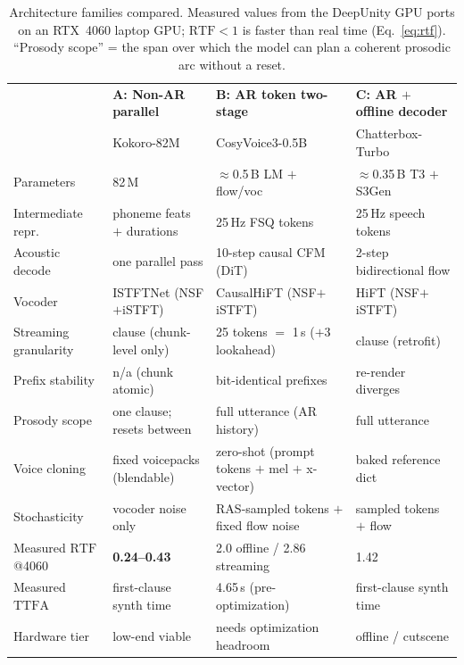 \documentclass[11pt,a4paper]{article}
\newcommand{\RTF}{\ensuremath{\mathrm{RTF}}}
\newcommand{\TTFA}{\ensuremath{\mathrm{TTFA}}}
\begin{document}
\begin{table}[htbp]
\centering
\caption{Architecture families compared. Measured values from the DeepUnity GPU ports on
an RTX~4060 laptop GPU; $\RTF < 1$ is faster than real time
(Eq.~\ref{eq:rtf}). ``Prosody scope'' = the span over which the model can plan a coherent
prosodic arc without a reset.}
\label{tab:families}
\small
\begin{tabular}{@{}p{3.4cm}p{3.6cm}p{3.8cm}p{3.6cm}@{}}
\toprule
 & \textbf{A: Non-AR parallel} & \textbf{B: AR token two-stage} & \textbf{C: AR $+$ offline decoder} \\
 & Kokoro-82M & CosyVoice3-0.5B & Chatterbox-Turbo \\
\midrule
Parameters & 82\,M & $\approx$0.5\,B LM $+$ flow/voc & $\approx$0.35\,B T3 $+$ S3Gen \\
Intermediate repr. & phoneme feats $+$ durations & 25\,Hz FSQ tokens & 25\,Hz speech tokens \\
Acoustic decode & one parallel pass & 10-step causal CFM (DiT) & 2-step bidirectional flow \\
Vocoder & ISTFTNet (NSF$+$iSTFT) & CausalHiFT (NSF$+$iSTFT) & HiFT (NSF$+$iSTFT) \\
Streaming granularity & clause (chunk-level only) & 25 tokens $=$ 1\,s ($+$3 lookahead) & clause (retrofit) \\
Prefix stability & n/a (chunk atomic) & bit-identical prefixes & re-render diverges \\
Prosody scope & one clause; resets between & full utterance (AR history) & full utterance \\
Voice cloning & fixed voicepacks (blendable) & zero-shot (prompt tokens $+$ mel $+$ x-vector) & baked reference dict \\
Stochasticity & vocoder noise only & RAS-sampled tokens $+$ fixed flow noise & sampled tokens $+$ flow \\
Measured \RTF{} @4060 & \textbf{0.24--0.43} & 2.0 offline / 2.86 streaming & 1.42 \\
Measured \TTFA{} & first-clause synth time & 4.65\,s (pre-optimization) & first-clause synth time \\
Hardware tier & low-end viable & needs optimization headroom & offline / cutscene \\
\bottomrule
\end{tabular}
\end{table}
\end{document}
